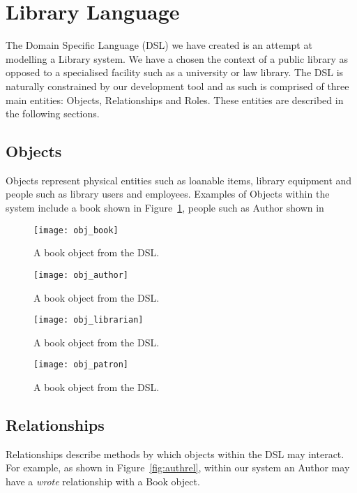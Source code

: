 \section{Library Language}
The Domain Specific Language (DSL) we have created is an attempt at modelling a Library system. We have a chosen the context of a public library as opposed to a specialised facility such as a university or law library. The DSL is naturally constrained by our development tool and as such  is comprised of three main entities: Objects, Relationships and Roles. These entities are described in the following sections. 

\subsection{Objects}
Objects represent physical entities such as loanable items, library equipment and people such as library users and employees. Examples of Objects within the system include a book shown in Figure~\ref{fig:objbook}, people such as Author shown in 

\begin{figure}
  \centering
  \texttt{[image: obj\_book]}  
  \caption{A book object from the DSL.}
  \label{fig:objbook}
\end{figure}

\begin{figure}[H]
  \centering
  \texttt{[image: obj\_author]}
  \caption{A book object from the DSL.}
  \label{fig:objauth}
\end{figure}

\begin{figure}[H]
  \centering
  \texttt{[image: obj\_librarian]}
  \caption{A book object from the DSL.}
  \label{fig:objlibr}
\end{figure}

\begin{figure}
  \centering
  \texttt{[image: obj\_patron]}
  \caption{A book object from the DSL.}
  \label{fig:objpat}
\end{figure}







\subsection{Relationships}
Relationships describe methods by which objects within the DSL may interact. For example, as shown in Figure~\ref{fig:authrel}, within our system an Author may have a \emph{wrote} relationship with a Book object.

